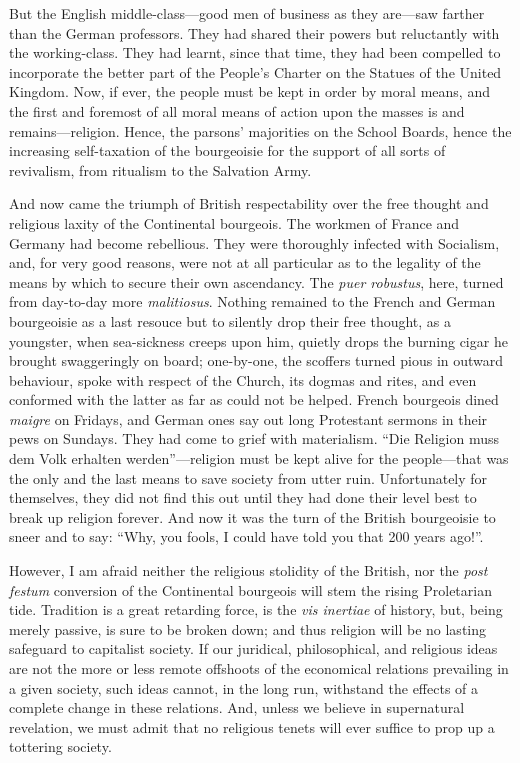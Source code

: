 But the English middle-class---good men of business as they are---saw farther
than the German professors. They had shared their powers but reluctantly with
the working-class. They had learnt, since that time, they had been compelled to
incorporate the better part of the People's Charter on the Statues of the United
Kingdom. Now, if ever, the people must be kept in order by moral means, and the
first and foremost of all moral means of action upon the masses is and
remains---religion. Hence, the parsons' majorities on the School Boards, hence
the increasing self-taxation of the bourgeoisie for the support of all sorts of
revivalism, from ritualism to the Salvation Army.

And now came the triumph of British respectability over the free thought and
religious laxity of the Continental bourgeois. The workmen of France and Germany
had become rebellious. They were thoroughly infected with Socialism, and, for
very good reasons, were not at all particular as to the legality of the means by
which to secure their own ascendancy. The \emph{puer robustus}, here, turned
from day-to-day more \emph{malitiosus}. Nothing remained to the French and
German bourgeoisie as a last resouce but to silently drop their free thought, as
a youngster, when sea-sickness creeps upon him, quietly drops the burning cigar
he brought swaggeringly on board; one-by-one, the scoffers turned pious in
outward behaviour, spoke with respect of the Church, its dogmas and rites, and
even conformed with the latter as far as could not be helped. French bourgeois
dined \emph{maigre} on Fridays, and German ones say out long Protestant sermons
in their pews on Sundays. They had come to grief with materialism. ``Die
Religion muss dem Volk erhalten werden''---religion must be kept alive for the
people---that was the only and the last means to save society from utter ruin.
Unfortunately for themselves, they did not find this out until they had done
their level best to break up religion forever. And now it was the turn of the
British bourgeoisie to sneer and to say: ``Why, you fools, I could have told you
that 200 years ago!''.

However, I am afraid neither the religious stolidity of the British, nor the
\emph{post festum} conversion of the Continental bourgeois will stem the rising
Proletarian tide. Tradition is a great retarding force, is the \emph{vis
inertiae} of history, but, being merely passive, is sure to be broken down; and
thus religion will be no lasting safeguard to capitalist society. If our
juridical, philosophical, and religious ideas are not the more or less remote
offshoots of the economical relations prevailing in a given society, such ideas
cannot, in the long run, withstand the effects of a complete change in these
relations. And, unless we believe in supernatural revelation, we must admit that
no religious tenets will ever suffice to prop up a tottering society.

\printendnotes
